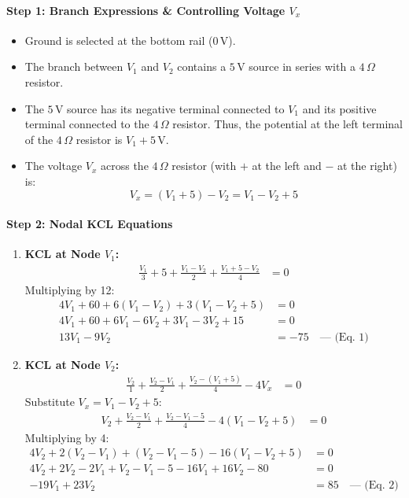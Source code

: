 \documentclass[11pt,a4paper,oneside]{article}
\begin{document}
\paragraph{Step 1: Branch Expressions \& Controlling Voltage $V_x$}
\begin{itemize}[leftmargin=1.5em]
  \item Ground is selected at the bottom rail ($0\,\mathrm{V}$).
  \item The branch between $V_1$ and $V_2$ contains a $5\,\mathrm{V}$ source in series with a $4\,\Omega$ resistor.
  \item The $5\,\mathrm{V}$ source has its negative terminal connected to $V_1$ and its positive terminal connected to the $4\,\Omega$ resistor. Thus, the potential at the left terminal of the $4\,\Omega$ resistor is $V_1 + 5\,\mathrm{V}$.
  \item The voltage $V_x$ across the $4\,\Omega$ resistor (with $+$ at the left and $-$ at the right) is:
  \begin{equation}
    V_x = (V_1 + 5) - V_2 = V_1 - V_2 + 5
  \end{equation}
\end{itemize}

\paragraph{Step 2: Nodal KCL Equations}
\begin{enumerate}[leftmargin=1.5em]
  \item \textbf{KCL at Node $V_1$:}
  \begin{align}
    \frac{V_1}{3} + 5 + \frac{V_1 - V_2}{2} + \frac{V_1 + 5 - V_2}{4} &= 0 \nonumber
  \end{align}
  Multiplying by 12:
  \begin{align}
    4V_1 + 60 + 6(V_1 - V_2) + 3(V_1 - V_2 + 5) &= 0 \nonumber \\
    4V_1 + 60 + 6V_1 - 6V_2 + 3V_1 - 3V_2 + 15 &= 0 \nonumber \\
    13 V_1 - 9 V_2 &= -75 \quad \text{--- (Eq. 1)}
  \end{align}

  \item \textbf{KCL at Node $V_2$:}
  \begin{align}
    \frac{V_2}{1} + \frac{V_2 - V_1}{2} + \frac{V_2 - (V_1 + 5)}{4} - 4V_x &= 0 \nonumber
  \end{align}
  Substitute $V_x = V_1 - V_2 + 5$:
  \begin{align}
    V_2 + \frac{V_2 - V_1}{2} + \frac{V_2 - V_1 - 5}{4} - 4(V_1 - V_2 + 5) &= 0 \nonumber
  \end{align}
  Multiplying by 4:
  \begin{align}
    4V_2 + 2(V_2 - V_1) + (V_2 - V_1 - 5) - 16(V_1 - V_2 + 5) &= 0 \nonumber \\
    4V_2 + 2V_2 - 2V_1 + V_2 - V_1 - 5 - 16V_1 + 16V_2 - 80 &= 0 \nonumber \\
    -19 V_1 + 23 V_2 &= 85 \quad \text{--- (Eq. 2)}
  \end{align}
\end{enumerate}
\end{document}
